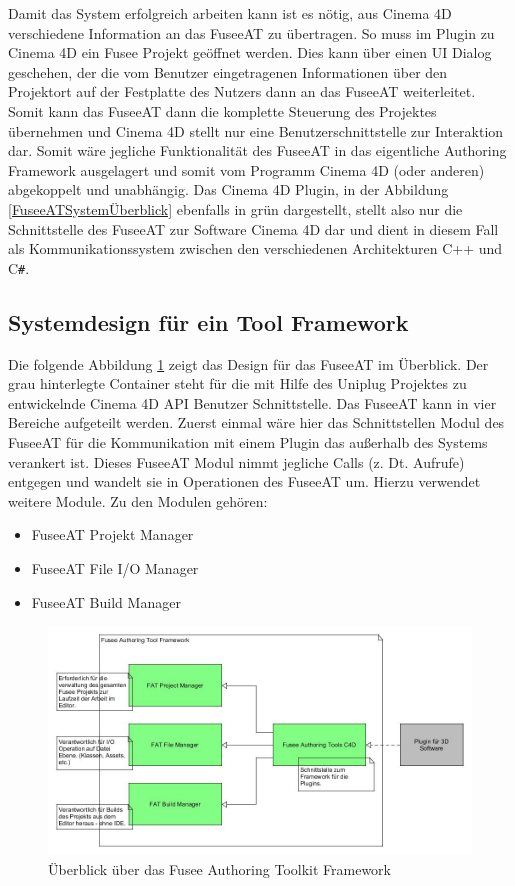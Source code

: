 \documentclass[pagesize, paper=a4, fontsize=12pt, titlepage=true, headings=small, headnosepline, abstractoff, liststotoc, nochapterprefix, plainheadsepline, twoside]{scrreprt}
\newcommand{\CS}{C\texttt{\#}}
\begin{document}
Damit das System erfolgreich arbeiten kann ist es nötig, aus Cinema 4D verschiedene Information an das FuseeAT zu übertragen. So muss im Plugin zu Cinema 4D ein Fusee Projekt geöffnet werden. Dies kann über einen UI Dialog geschehen, der die vom Benutzer eingetragenen Informationen über den Projektort auf der Festplatte des Nutzers dann an das FuseeAT weiterleitet. Somit kann das FuseeAT dann die komplette Steuerung des Projektes übernehmen und Cinema 4D stellt nur eine Benutzerschnittstelle zur Interaktion dar. Somit wäre jegliche Funktionalität des FuseeAT in das eigentliche Authoring Framework ausgelagert und somit vom Programm Cinema 4D (oder anderen) abgekoppelt und unabhängig. Das Cinema 4D Plugin, in der Abbildung \ref{FuseeATSystemÜberblick} ebenfalls in grün dargestellt, stellt also nur die Schnittstelle des FuseeAT zur Software Cinema 4D dar und dient in diesem Fall als Kommunikationssystem zwischen den verschiedenen Architekturen C++ und \CS.


\subsection{Systemdesign für ein Tool Framework}
Die folgende Abbildung \ref{FrameworkÜberblick} zeigt das Design für das FuseeAT im Überblick. Der grau hinterlegte Container steht für die mit Hilfe des Uniplug Projektes zu entwickelnde Cinema 4D API Benutzer Schnittstelle. Das FuseeAT kann in vier Bereiche aufgeteilt werden. Zuerst einmal wäre hier das Schnittstellen Modul des FuseeAT für die Kommunikation mit einem Plugin das außerhalb des Systems verankert ist. Dieses FuseeAT Modul nimmt jegliche Calls (z. Dt. Aufrufe) entgegen und wandelt sie in Operationen des FuseeAT um. Hierzu verwendet weitere Module. Zu den Modulen gehören:
\begin{itemize}
\item FuseeAT Projekt Manager
\item FuseeAT File I/O Manager
\item FuseeAT Build Manager
\end{itemize}

\begin{figure}[ht]
	\centering
	\includegraphics[width=\linewidth]{Bilder/Ueberblick_Framework.jpg}
	\caption{Überblick über das Fusee Authoring Toolkit Framework}
	\label{FrameworkÜberblick}
\end{figure}
\end{document}

